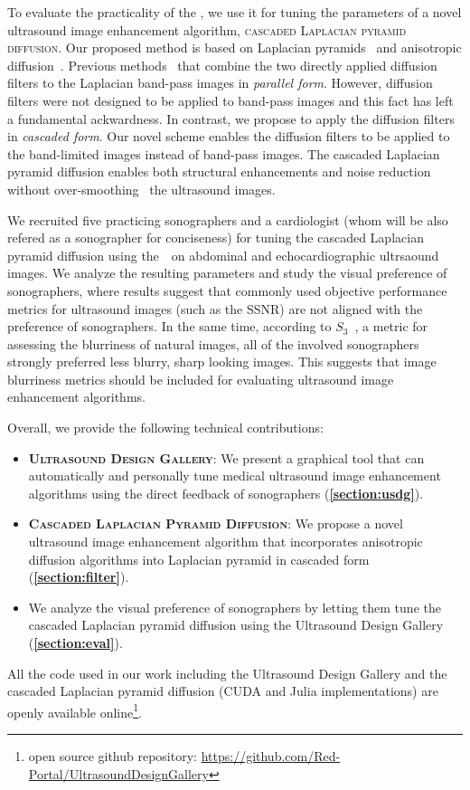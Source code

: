 To evaluate the practicality of the \usdg, we use it for tuning the parameters of a novel ultrasound image enhancement algorithm, \textsc{cascaded Laplacian pyramid diffusion}.
Our proposed method is based on Laplacian pyramids~\cite{burt_laplacian_1983} and anisotropic diffusion~\cite{perona_scalespace_1990, weickert_anisotropic_1998}.
Previous methods~\cite{zhang_multiscale_2006, zhang_nonlinear_2007, kang_new_2016} that combine the two directly applied diffusion filters to the Laplacian band-pass images in \textit{parallel form}.
However, diffusion filters were not designed to be applied to band-pass images and this fact has left a fundamental ackwardness.
In contrast, we propose to apply the diffusion filters in \textit{cascaded form}.
Our novel scheme enables the diffusion filters to be applied to the band-limited images instead of band-pass images.
The cascaded Laplacian pyramid diffusion enables both structural enhancements and noise reduction without over-smoothing~\cite{ramos-llorden_anisotropic_2015, mishra_edge_2018} the ultrasound images.

We recruited five practicing sonographers and a cardiologist (whom will be also refered as a sonographer for conciseness) for tuning the cascaded Laplacian pyramid diffusion using the~\usdg~on abdominal and echocardiographic ultrsaound images.
We analyze the resulting parameters and study the visual preference of sonographers, where results suggest that commonly used objective performance metrics for ultrasound images (such as the SSNR) are not aligned with the preference of sonographers.
In the same time, according to \(S_3\)~\cite{vu_bf_2012}, a metric for assessing the blurriness of natural images, all of the involved sonographers strongly preferred less blurry, sharp looking images.
This suggests that image blurriness metrics should be included for evaluating ultrasound image enhancement algorithms.

\noindent Overall, we provide the following technical contributions:
\begin{itemize}
  \item[\ding{228}] \textsc{\textbf{Ultrasound Design Gallery}}: We present a graphical tool that can automatically and personally tune medical ultrasound image enhancement algorithms using the direct feedback of sonographers (\textbf{\cref{section:usdg}}).
    \vspace{0.02in}
  \item[\ding{228}] \textsc{\textbf{Cascaded Laplacian Pyramid Diffusion}}:  We propose a novel ultrasound image enhancement algorithm that incorporates anisotropic diffusion algorithms into Laplacian pyramid in cascaded form (\textbf{\cref{section:filter}}).
  \item[\ding{228}] We analyze the visual preference of sonographers by letting them tune the cascaded Laplacian pyramid diffusion using the Ultrasound Design Gallery (\textbf{\cref{section:eval}}).
\end{itemize}
All the code used in our work including the Ultrasound Design Gallery and the cascaded Laplacian pyramid diffusion (CUDA and Julia implementations) are openly available online\footnote{open source github repository: \url{https://github.com/Red-Portal/UltrasoundDesignGallery}}.

